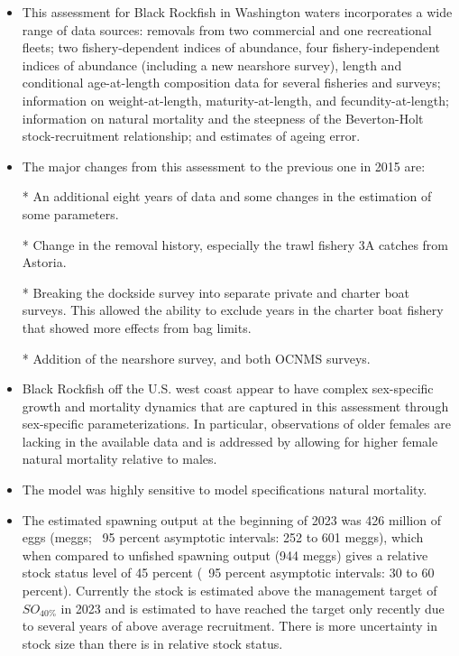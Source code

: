 \documentclass[11pt,
  english,
  letterpaper,
]{article}
\begin{document}
\begin{itemize}

\item This assessment for Black Rockfish in Washington waters incorporates a wide range of data sources: removals from two commercial and one recreational fleets; two fishery-dependent indices of abundance, four fishery-independent indices of abundance (including a new nearshore survey), length and conditional age-at-length composition data for several fisheries and surveys; information on weight-at-length, maturity-at-length, and fecundity-at-length; information on natural mortality and the steepness of the Beverton-Holt stock-recruitment relationship; and estimates of ageing error.

\item The major changes from this assessment to the previous one in 2015 are:

* An additional eight years of data and some changes in the estimation of some parameters.

* Change in the removal history, especially the trawl fishery 3A catches from Astoria.

* Breaking the dockside survey into separate private and charter boat surveys. This allowed the ability to exclude years in the charter boat fishery that showed more effects from bag limits.

* Addition of the nearshore survey, and both OCNMS surveys.


\item Black Rockfish off the U.S. west coast appear to have complex sex-specific growth and mortality dynamics that are captured in this assessment through sex-specific parameterizations. In particular, observations of older females are lacking in the available data and is addressed by allowing for higher female natural mortality relative to males.

\item The model was highly sensitive to model specifications natural mortality. 

\item The estimated spawning output at the beginning of 2023 was 426 million of eggs (meggs; ~95 percent asymptotic intervals: 252 to 601 meggs), which when compared to unfished spawning output (944 meggs) gives a relative stock status level of 45 percent (~95 percent asymptotic intervals: 30 to 60 percent).  Currently the stock is estimated above the management target of $SO_{40\%}$ in 2023 and is estimated to have reached the target only recently due to several years of above average recruitment. There is more uncertainty in stock size than there is in relative stock status.


\end{itemize}
\end{document}
